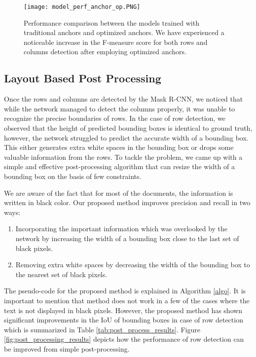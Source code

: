 \documentclass{ieeeaccess}
\begin{document}
\begin{figure}[ht]
    \texttt{[image: model\_perf\_anchor\_op.PNG]}
    \caption{Performance comparison between the models trained with traditional anchors and optimized anchors. We have experienced a noticeable increase in the F-measure score for both rows and columns detection after employing optimized anchors.}
    \label{fig:model_perf_anchor_op}
\end{figure}


\subsection{Layout Based Post Processing} 

Once the rows and columns are detected by the Mask R-CNN, we noticed that while the network managed to detect the columns properly, it was unable to recognize the precise boundaries of rows. In the case of row detection, we observed that the height of predicted bounding boxes is identical to ground truth, however, the network struggled to predict the accurate width of a bounding box. This either generates extra white spaces in the bounding box or drops some valuable information from the rows. To tackle the problem, we came up with a simple and effective post-processing algorithm that can resize the width of a bounding box on the basis of few constraints.

We are aware of the fact that for most of the documents, the information is written in black color. Our proposed method improves precision and recall in two ways:

\begin{enumerate}
    \item Incorporating the important information which was overlooked by the network by increasing the width of a bounding box close to the last set of black pixels.
    \item Removing extra white spaces by decreasing the width of the bounding box to the nearest set of black pixels.
\end{enumerate}

The pseudo-code for the proposed method is explained in Algorithm \ref{algo}. It is important to mention that method does not work in a few of the cases where the text is not displayed in black pixels. However, the proposed method has shown significant improvements in the IoU of bounding boxes in case of row detection which is summarized in Table \ref{tab:post_process_results}. Figure \ref{fig:post_processing_results} depicts how the performance of row detection can be improved from simple post-processing.
\end{document}
